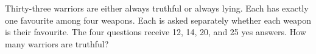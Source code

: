 Thirty-three warriors are either always truthful or always lying. Each has exactly one favourite among four weapons. Each is asked separately whether each weapon is their favourite. The four questions receive 12, 14, 20, and 25 yes answers. How many warriors are truthful?
